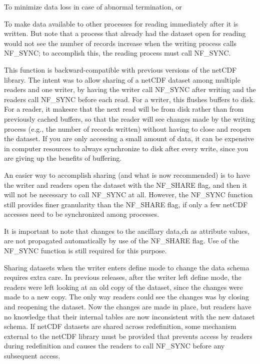 \begin{DoxyItemize}
\item To minimize data loss in case of abnormal termination, or
\item To make data available to other processes for reading immediately after it is written. But note that a process that already had the dataset open for reading would not see the number of records increase when the writing process calls N\+F\+\_\+\+S\+Y\+NC; to accomplish this, the reading process must call N\+F\+\_\+\+S\+Y\+NC.
\end{DoxyItemize}

This function is backward-\/compatible with previous versions of the net\+C\+DF library. The intent was to allow sharing of a net\+C\+DF dataset among multiple readers and one writer, by having the writer call N\+F\+\_\+\+S\+Y\+NC after writing and the readers call N\+F\+\_\+\+S\+Y\+NC before each read. For a writer, this flushes buffers to disk. For a reader, it makesre that the next read will be from disk rather than from previously cached buffers, so that the reader will see changes made by the writing process (e.\+g., the number of records written) without having to close and reopen the dataset. If you are only accessing a small amount of data, it can be expensive in computer resources to always synchronize to disk after every write, since you are giving up the benefits of buffering.

An easier way to accomplish sharing (and what is now recommended) is to have the writer and readers open the dataset with the N\+F\+\_\+\+S\+H\+A\+RE flag, and then it will not be necessary to call N\+F\+\_\+\+S\+Y\+NC at all. However, the N\+F\+\_\+\+S\+Y\+NC function still provides finer granularity than the N\+F\+\_\+\+S\+H\+A\+RE flag, if only a few net\+C\+DF accesses need to be synchronized among processes.

It is important to note that changes to the ancillary data,ch as attribute values, are not propagated automatically by use of the N\+F\+\_\+\+S\+H\+A\+RE flag. Use of the N\+F\+\_\+\+S\+Y\+NC function is still required for this purpose.

Sharing datasets when the writer enters define mode to change the data schema requires extra care. In previous releases, after the writer left define mode, the readers were left looking at an old copy of the dataset, since the changes were made to a new copy. The only way readers could see the changes was by closing and reopening the dataset. Now the changes are made in place, but readers have no knowledge that their internal tables are now inconsistent with the new dataset schema. If net\+C\+DF datasets are shared across redefinition, some mechanism external to the net\+C\+DF library must be provided that prevents access by readers during redefinition and causes the readers to call N\+F\+\_\+\+S\+Y\+NC before any subsequent access.

